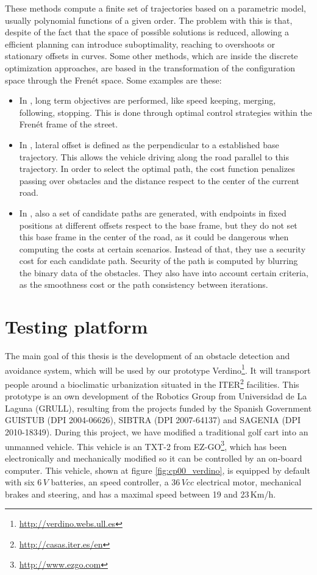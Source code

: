 These methods compute a finite set of trajectories based on a parametric model, usually polynomial functions of a given order. The problem with this is that, despite of the fact that the space of possible solutions is reduced, allowing a efficient planning can introduce suboptimality, reaching to overshoots or stationary offsets in curves.
Some other methods, which are inside the discrete optimization approaches, are based in the transformation of the configuration space through the Fren\'et space. Some examples are these:
\begin{itemize}
 \item In \cite{werling2010optimal}, long term objectives are performed, like speed keeping, merging, following, stopping. This is done through optimal control strategies within the Fren\'et frame of the street.
 \item In \cite{thrun2006stanley}, lateral offset is defined as the perpendicular to a established base trajectory. This allows the vehicle driving along the road parallel to this trajectory. In order to select the optimal path, the cost function penalizes passing over obstacles and the distance respect to the center of the current road.
 \item In \cite{chu2012local}, also a set of candidate paths are generated, with endpoints in fixed positions at different offsets respect to the base frame, but they do not set this base frame in the center of the road, as it could be dangerous when computing the costs at certain scenarios. Instead of that, they use a security cost for each candidate path. Security of the path is computed by blurring the binary data of the obstacles. They also have into account certain criteria, as the smoothness cost or the path consistency between iterations.
\end{itemize}

\section{Testing platform}\label{ch:chapter00_03}


The main goal of this thesis is the development of an obstacle detection and avoidance system, which will be used by our prototype Verdino\footnote{\url{http://verdino.webs.ull.es}}. It will transport people around a bioclimatic urbanization situated in the ITER\footnote{\url{http://casas.iter.es/en}} facilities. This prototype is an own development of the Robotics Group from Universidad de La Laguna (GRULL), resulting from the projects funded by the Spanish Government GUISTUB (DPI 2004-06626), SIBTRA (DPI 2007-64137) and SAGENIA (DPI 2010-18349). During this project, we have modified a traditional golf cart into an unmanned vehicle. 
This vehicle is an TXT-2 from EZ-GO\footnote{\url{http://www.ezgo.com}}, which has been electronically and mechanically modified so it can be controlled by an on-board computer. This vehicle, shown at figure \ref{fig:cp00_verdino}, is equipped by default with six $6\,V$ batteries, an speed controller, a $36\,Vcc$ electrical motor, mechanical brakes and steering, and has a maximal speed between 19 and 23\,Km/h.

